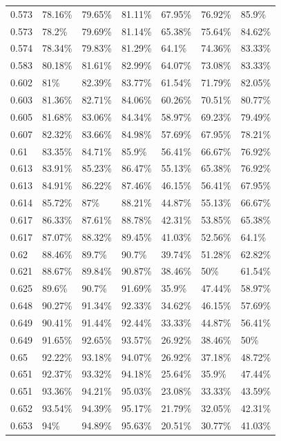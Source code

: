 \documentclass[a4paper,titlepage]{ppgi}\usepackage[]{graphicx}\usepackage[]{color}
\begin{document}
\begin{longtable}{l l l l l l l}
0.573 & 78.16\% & 79.65\% & 81.11\% & 67.95\% & 76.92\% & 85.9\% \\
0.573 & 78.2\% & 79.69\% & 81.14\% & 65.38\% & 75.64\% & 84.62\% \\
0.574 & 78.34\% & 79.83\% & 81.29\% & 64.1\% & 74.36\% & 83.33\% \\
0.583 & 80.18\% & 81.61\% & 82.99\% & 64.07\% & 73.08\% & 83.33\% \\
0.602 & 81\% & 82.39\% & 83.77\% & 61.54\% & 71.79\% & 82.05\% \\
0.603 & 81.36\% & 82.71\% & 84.06\% & 60.26\% & 70.51\% & 80.77\% \\
0.605 & 81.68\% & 83.06\% & 84.34\% & 58.97\% & 69.23\% & 79.49\% \\
0.607 & 82.32\% & 83.66\% & 84.98\% & 57.69\% & 67.95\% & 78.21\% \\
0.61 & 83.35\% & 84.71\% & 85.9\% & 56.41\% & 66.67\% & 76.92\% \\
0.613 & 83.91\% & 85.23\% & 86.47\% & 55.13\% & 65.38\% & 76.92\% \\
0.613 & 84.91\% & 86.22\% & 87.46\% & 46.15\% & 56.41\% & 67.95\% \\
0.614 & 85.72\% & 87\% & 88.21\% & 44.87\% & 55.13\% & 66.67\% \\
0.617 & 86.33\% & 87.61\% & 88.78\% & 42.31\% & 53.85\% & 65.38\% \\
0.617 & 87.07\% & 88.32\% & 89.45\% & 41.03\% & 52.56\% & 64.1\% \\
0.62 & 88.46\% & 89.7\% & 90.7\% & 39.74\% & 51.28\% & 62.82\% \\
0.621 & 88.67\% & 89.84\% & 90.87\% & 38.46\% & 50\% & 61.54\% \\
0.625 & 89.6\% & 90.7\% & 91.69\% & 35.9\% & 47.44\% & 58.97\% \\
0.648 & 90.27\% & 91.34\% & 92.33\% & 34.62\% & 46.15\% & 57.69\% \\
0.649 & 90.41\% & 91.44\% & 92.44\% & 33.33\% & 44.87\% & 56.41\% \\
0.649 & 91.65\% & 92.65\% & 93.57\% & 26.92\% & 38.46\% & 50\% \\
0.65 & 92.22\% & 93.18\% & 94.07\% & 26.92\% & 37.18\% & 48.72\% \\
0.651 & 92.37\% & 93.32\% & 94.18\% & 25.64\% & 35.9\% & 47.44\% \\
0.651 & 93.36\% & 94.21\% & 95.03\% & 23.08\% & 33.33\% & 43.59\% \\
0.652 & 93.54\% & 94.39\% & 95.17\% & 21.79\% & 32.05\% & 42.31\% \\
0.653 & 94\% & 94.89\% & 95.63\% & 20.51\% & 30.77\% & 41.03\% \\

\end{longtable}
\end{document}
